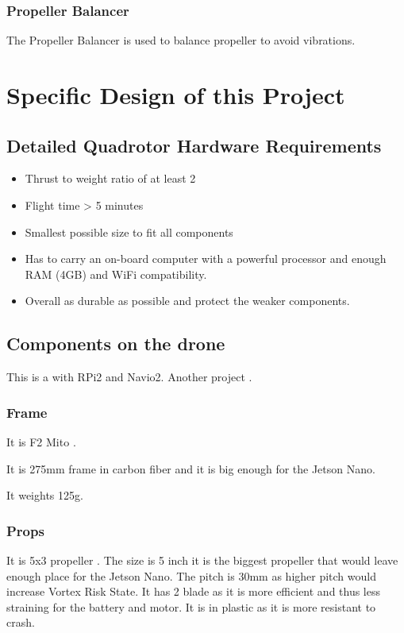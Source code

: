 \subsubsection{Propeller Balancer}
The Propeller Balancer is used to balance propeller to avoid vibrations.


\section{Specific Design of this Project}

\subsection{Detailed Quadrotor Hardware Requirements}
\begin{itemize}
    \item Thrust to weight ratio of at least 2
    \item Flight time > 5 minutes
    \item Smallest possible size to fit all components
    \item Has to carry an on-board computer with a powerful processor and enough RAM (4GB) and WiFi compatibility.
    \item Overall as durable as possible and protect the weaker components.
\end{itemize}

\subsection{Components on the drone}


This is a \cite{hackaday_navio} with RPi2 and Navio2.
Another project \cite{instructables_navio}.

\subsubsection{Frame}
It is F2 Mito \cite{bangood_f2_mito}.

It is 275mm frame in carbon fiber and it is big enough for the Jetson Nano.

It weights 125g.

\subsubsection{Props}
It is 5x3 propeller \cite{bangood_propeller}. The size is 5 inch it is the biggest propeller that would leave enough place for the Jetson Nano. The pitch is 30mm as higher pitch would increase Vortex Risk State. It has 2 blade as it is more efficient and thus less straining for the battery and motor. It is in plastic as it is more resistant to crash.

